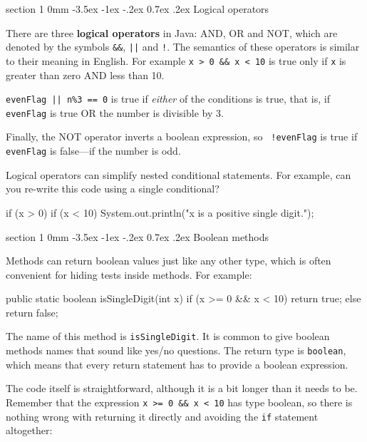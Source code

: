 \documentclass{book}
\makeatletter
\renewcommand{\section}{\@startsection 
    {section} {1} {0mm}%
    {-3.5ex \@plus -1ex \@minus -.2ex}%
    {0.7ex \@plus.2ex}%
    {\normalfont\Large\bfseries}}
\makeatother
\begin{document}
\section{Logical operators}

There are three {\bf logical operators} in Java: AND, OR and NOT,
which are denoted by the symbols {\tt \&\&}, {\tt ||} and
{\tt !}.  The semantics of these operators is similar
to their meaning in English.  For example {\tt x > 0 \&\& x < 10}
is true only if {\tt x} is greater than zero AND less than 10.


{\tt evenFlag || n\%3 == 0} is true if {\em either} of
the conditions is true, that is, if {\tt evenFlag} is true OR the
number is divisible by 3.

Finally, the NOT operator inverts a boolean expression, so {\tt
  !evenFlag} is true if {\tt evenFlag} is false---if the number is
odd.


Logical operators can simplify nested
conditional statements.  For example, can you re-write
this code using a single conditional?

\begin{verbatimtab}
    if (x > 0) {
      if (x < 10) {
        System.out.println("x is a positive single digit.");
      }
    }
\end{verbatimtab}


\section{Boolean methods}
\label{boolean}

Methods can return boolean values just like any other type,
which is often convenient for hiding tests inside
methods.  For example:

\begin{verbatimtab}
  public static boolean isSingleDigit(int x) {
    if (x >= 0 && x < 10) {
      return true;
    } else {
      return false;
    }
  }
\end{verbatimtab}
%
The name of this method is {\tt isSingleDigit}.  It is common
to give boolean methods names that sound like yes/no questions.
The return type is {\tt boolean}, which means that every return
statement has to provide a boolean expression.

The code itself is straightforward, although it is a bit longer than
it needs to be.  Remember that the expression {\tt x >= 0 \&\& x < 10}
has type boolean, so there is nothing wrong with returning it
directly and avoiding the {\tt if} statement altogether:
\end{document}
